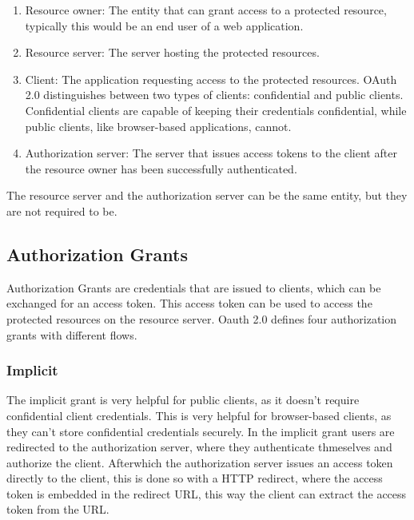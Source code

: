 \begin{enumerate}
	\item Resource owner: The entity that can grant access to a protected resource, typically this would be an end user of a web application.
	\item Resource server: The server hosting the protected resources.
	\item Client: The application requesting access to the protected resources.
	      OAuth 2.0 distinguishes between two types of clients: confidential and public clients.
	      Confidential clients are capable of keeping their credentials confidential, while public clients, like browser-based applications, cannot.
	\item Authorization server: The server that issues access tokens to the client after the resource owner has been successfully authenticated.
\end{enumerate}

The resource server and the authorization server can be the same entity, but they are not required to be.

\subsection{Authorization Grants}


Authorization Grants are credentials that are issued to clients, which can be exchanged for an access token.
This access token can be used to access the protected resources on the resource server.
Oauth 2.0 defines four authorization grants with different flows.


\subsubsection{Implicit}
\label{cha:relatedwork:oauth:implicit}

The implicit grant is very helpful for public clients, as it doesn't require confidential client credentials.
This is very helpful for browser-based clients, as they can't store confidential credentials securely.
In the implicit grant users are redirected to the authorization server, where they authenticate thmeselves and authorize the client.
Afterwhich the authorization server issues an access token directly to the client,
this is done so with a HTTP redirect, where the access token is embedded in the redirect URL,
this way the client can extract the access token from the URL.

